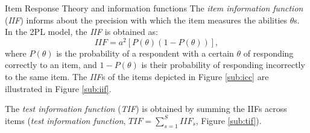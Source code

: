 \documentclass[final,t]{beamer}
\begin{document}
\begin{frame}
\begin{columns}[t]
\begin{column}{.45\linewidth}
\begin{block}{\centering Item Response Theory and information functions}
	The \emph{item information function} (\emph{IIF}) informs about the precision with which the item measures the abilities $\theta$s.
	In the 2PL model, the \emph{IIF} is obtained as: 
	\begin{equation}\label{eq:IIF}
		\mathit{IIF} = a^2[P(\theta)(1-P(\theta))],
	\end{equation}
	where $P(\theta)$ is the probability of a respondent with a certain $\theta$ of responding correctly to an item, and $1 - P(\theta)$ is their probability of  responding incorrectly to the same item. The \emph{IIF}s of the items depicted in Figure \ref{sub:icc} are illustrated in Figure \ref{sub:iif}. 
	
	The \emph{test information function} (\emph{TIF}) is obtained by summing the IIFs across items (\emph{test information function}, $ \mathit{TIF} = \sum_{s=1}^{S} \mathit{IIF}_s$, Figure \ref{sub:tif}). 
	

\end{block}
\end{column}
\end{columns}
\end{frame}
\end{document}
